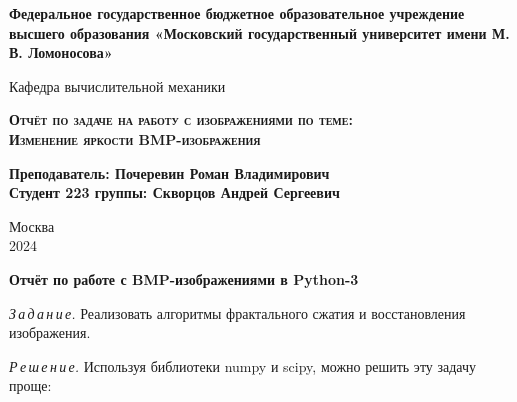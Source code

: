 \documentclass{article}
\begin{document}
\begin{titlepage}
	\newpage
	
	\begin{center}
		\textbf{Федеральное государственное бюджетное образовательное учреждение высшего образования «Московский государственный университет имени М. В. Ломоносова»}\\
	\end{center}
	
	\vspace{8em}
	
	\begin{center}
		\Large Кафедра вычислительной механики \\ 
	\end{center}
	
	\vspace{2em}
	
	\begin{center}
		\Large \textsc{\textbf{Отчёт по задаче на работу с изображениями по теме:}}
		\\
		\Large \textsc{\textbf{ Изменение яркости BMP-изображения \linebreak}}
	\end{center}
	
	\vspace{15em}
	
	
	
	\begin{flushright}
		\small
		\textbf{Преподаватель: Почеревин Роман Владимирович}\\
		\textbf{Студент 223 группы: Скворцов Андрей Сергеевич}\\
	\end{flushright}
	
	
	\vspace{\fill}
	
	\begin{center}
		Москва \\2024
	\end{center}
	
\end{titlepage}

\begin{center}


{\large\bf Отчёт по работе с BMP-изображениями в Python-3}
\end{center}
\textit{З\,а\,д\,а\,н\,и\,е.} Реализовать алгоритмы фрактального сжатия и восстановления изображения.

 
\textit{Р\,е\,ш\,е\,н\,и\,е.}  Используя библиотеки numpy и scipy, можно решить эту задачу проще:
\end{document}
